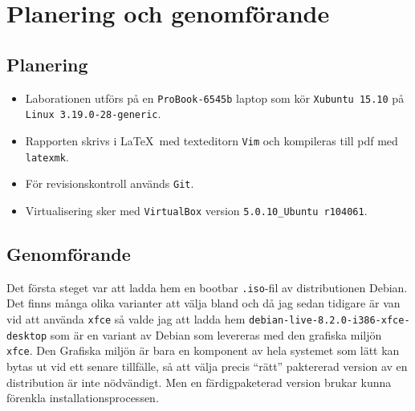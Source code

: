 \section{Planering och genomförande}

\subsection{Planering}

\begin{itemize}
  \item Laborationen utförs på en \texttt{ProBook-6545b} laptop som kör
        \texttt{Xubuntu 15.10} på \texttt{Linux 3.19.0-28-generic}.

  \item Rapporten skrivs i \LaTeX\ med texteditorn \texttt{Vim} och kompileras
        till pdf med \texttt{latexmk}.

  \item För revisionskontroll används \texttt{Git}.

  \item Virtualisering sker med \texttt{VirtualBox} version
        \texttt{5.0.10\_Ubuntu r104061}.

\end{itemize}

\subsection{Genomförande}
Det första steget var att ladda hem en bootbar \texttt{.iso}-fil av
distributionen Debian. Det finns många olika varianter att välja bland och då
jag sedan tidigare är van vid att använda \texttt{xfce} så valde jag att ladda
hem \texttt{debian-live-8.2.0-i386-xfce-desktop} som är en variant av Debian
som levereras med den grafiska miljön \texttt{xfce}. Den Grafiska miljön är
bara en komponent av hela systemet som lätt kan bytas ut vid ett senare
tillfälle, så att välja precis ``rätt'' paktererad version av en distribution
är inte nödvändigt.  Men en färdigpaketerad version brukar kunna förenkla
installationsprocessen.

